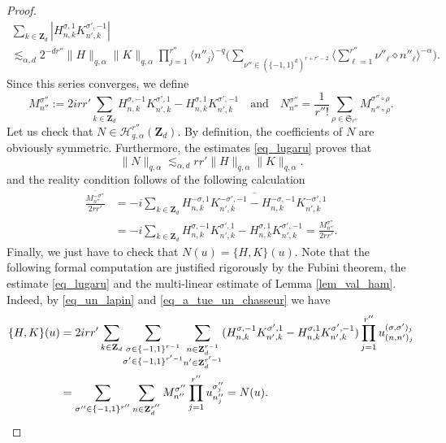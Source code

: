 \documentclass[JEP,XML,SOM,Unicode,NoEqCountersInSection,published]{cedram}
\theoremstyle{definition}
\begin{document}
\begin{proof}
\begin{multline}
\sum_{k\in \mathbf{Z}_d}|H_{n,k}^{\sigma,1} K_{n',k}^{\sigma',-1}|\\[-15pt] \lesssim_{\alpha,d} 2^{-dr''}\| H \|_{q,\alpha} \|K \|_{q,\alpha}\prod_{j=1}^{r''} \langle n''_j \rangle^{-q}
\Big(\! \! \! \! \! \! \! \! \! \! \! \! \! \sum_{\nu'' \in (\{-1,1\}^d)^{r+r'-2} } \! \! \big\langle \sum_{\ell =1}^{r''} \nu''_{\ell} \diamond n''_{\ell} \big\rangle^{-\alpha} \Big).
\end{multline}
Since this series converges, we define
\[
M_{n''}^{\sigma''}:= 2 i r r' \sum_{k\in \mathbf{Z}_d} H_{n,k}^{\sigma,-1} K_{n',k}^{\sigma',1} - H_{n,k}^{\sigma,1} K_{n',k}^{\sigma',-1} \quad \text{and} \quad N_{n''}^{\sigma''} = \frac1{r'' !} \sum_{\rho \in \mathfrak{S}_{r''}} M_{n''\circ \rho}^{\sigma''\circ \rho}.
\]
Let us check that $N\in \mathscr{H}_{q,\alpha}^{r''}(\mathbf{Z}_d)$. By definition, the coefficients of $N$ are obviously symmetric. Furthermore, the estimates \eqref{eq_lugaru} proves that
\[
\| N\|_{q,\alpha} \lesssim_{\alpha,d} r r' \| H \|_{q,\alpha} \|K \|_{q,\alpha}.
\]
and the reality condition follows of the following calculation
\begin{equation*}
\begin{split}
\frac{\overline{M_{n''}^{-\sigma''} }}{2rr'} &= -i \sum_{k\in \mathbf{Z}_d} \overline{H_{n,k}^{-\sigma,1} K_{n',k}^{-\sigma',-1} - H_{n,k}^{-\sigma,-1} K_{n',k}^{-\sigma',1}}
\\ &= -i \sum_{k\in \mathbf{Z}_d} H_{n,k}^{\sigma,-1} K_{n',k}^{\sigma',1} - H_{n,k}^{\sigma,1} K_{n',k}^{\sigma',-1} = \frac{M_{n''}^{\sigma''}}{2rr'}.
\end{split}
\end{equation*}
Finally, we just have to check that $N(u) = \{ H,K\}(u) $. Note that the following formal computation are justified rigorously by the Fubini theorem, the estimate \eqref{eq_lugaru} and the multi-linear estimate of Lemma \ref{lem_val_ham}. Indeed, by \eqref{eq_un_lapin} and \eqref{eq_a_tue_un_chasseur} we have
\begin{align*}
\{ H,K\}(u) &= 2irr' \sum_{k\in \mathbf{Z}_d} \! \sum_{\substack{\sigma \in \{-1,1\}^{r-1}\\ \sigma' \in \{-1,1\}^{r'-1} }} \! \sum_{\substack{n\in \mathbf{Z}_d^{r-1} \\ n'\in \mathbf{Z}_d^{r'-1} }} (H_{n,k}^{\sigma,-1} K_{n',k}^{\sigma',1} -H_{n,k}^{\sigma,1} K_{n',k}^{\sigma',-1}) \prod_{j=1}^{r''} u_{(n,n')_j}^{(\sigma,\sigma')_j} \\
&= \sum_{\sigma'' \in \{-1,1\}^{r''}} \sum_{n\in \mathbf{Z}_d^{r''} } M_{n''}^{\sigma''}\prod_{j=1}^{r''} u_{n''_j}^{\sigma''_j} = N(u).\qedhere
\end{align*}
\end{proof}
\end{document}
